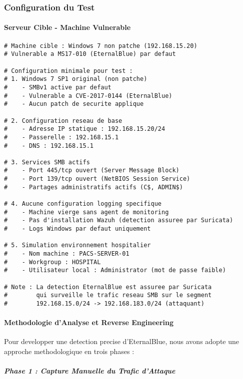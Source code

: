 \subsubsection{Configuration du Test}

\paragraph{Serveur Cible - Machine Vulnerable}
\begin{lstlisting}[style=bashstyle,caption=Configuration machine vulnerable pour test EternalBlue]
# Machine cible : Windows 7 non patche (192.168.15.20)
# Vulnerable a MS17-010 (EternalBlue) par defaut

# Configuration minimale pour test :
# 1. Windows 7 SP1 original (non patche)
#    - SMBv1 active par defaut
#    - Vulnerable a CVE-2017-0144 (EternalBlue)
#    - Aucun patch de securite applique

# 2. Configuration reseau de base
#    - Adresse IP statique : 192.168.15.20/24
#    - Passerelle : 192.168.15.1
#    - DNS : 192.168.15.1

# 3. Services SMB actifs
#    - Port 445/tcp ouvert (Server Message Block)
#    - Port 139/tcp ouvert (NetBIOS Session Service)
#    - Partages administratifs actifs (C$, ADMIN$)

# 4. Aucune configuration logging specifique
#    - Machine vierge sans agent de monitoring
#    - Pas d'installation Wazuh (detection assuree par Suricata)
#    - Logs Windows par defaut uniquement

# 5. Simulation environnement hospitalier
#    - Nom machine : PACS-SERVER-01
#    - Workgroup : HOSPITAL
#    - Utilisateur local : Administrator (mot de passe faible)

# Note : La detection EternalBlue est assuree par Suricata
#        qui surveille le trafic reseau SMB sur le segment
#        192.168.15.0/24 -> 192.168.183.0/24 (attaquant)
\end{lstlisting}

\paragraph{Methodologie d'Analyse et Reverse Engineering}

Pour developper une detection precise d'EternalBlue, nous avons adopte une approche methodologique en trois phases :

\subparagraph{Phase 1 : Capture Manuelle du Trafic d{'}Attaque}

